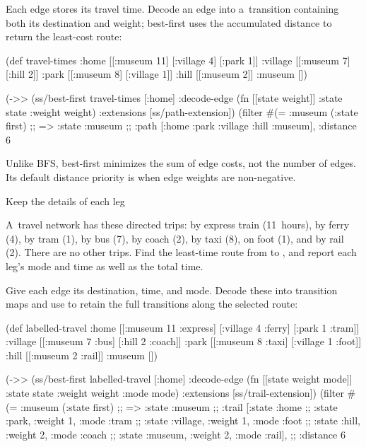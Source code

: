 {{\smallskip
{} Each edge stores its travel time. Decode an edge
into a~transition containing both its destination and weight; best-first
uses the accumulated distance to return the least-cost route:

\begtt {}
(def travel-times
  {:home [[:museum 11] [:village 4] [:park 1]]
   :village [[:museum 7] [:hill 2]]
   :park [[:museum 8] [:village 1]]
   :hill [[:museum 2]]
   :museum []})

(->> (ss/best-first travel-times [:home]
                        {:decode-edge (fn [[state weight]]
                                        {:state state :weight weight})
                         :extensions [ss/path-extension]})
     (filter #(= :museum (:state %
     first)
;; => {:state :museum
;;     :path [:home :park :village :hill :museum], :distance 6}
\endtt

Unlike BFS, best-first minimizes the sum of edge costs, not the number of
edges. Its default distance priority is
when edge weights are non-negative.

\secc Keep the details of each leg

 A~travel network has these directed trips:
 by express train (11~hours),  by ferry (4),  by tram (1),
 by bus (7),  by coach
(2),  by taxi (8),  on
foot (1), and  by rail (2). There are no other
trips. Find the least-time route from  to , and
report each leg's mode and time as well as the total time.

\smallskip
{} Give each edge its destination, time, and mode.
Decode these into transition maps and use  to retain
the full transitions along the selected route:

\begtt {}
(def labelled-travel
  {:home [[:museum 11 :express]
          [:village 4 :ferry]
          [:park 1 :tram]]
   :village [[:museum 7 :bus]
             [:hill 2 :coach]]
   :park [[:museum 8 :taxi]
          [:village 1 :foot]]
   :hill [[:museum 2 :rail]]
   :museum []})

(->> (ss/best-first labelled-travel [:home]
                        {:decode-edge (fn [[state weight mode]]
                                        {:state state
                                         :weight weight
                                         :mode mode})
                         :extensions [ss/trail-extension]})
     (filter #(= :museum (:state %
     first)
;; => {:state :museum
;;     :trail [{:state :home}
;;             {:state :park, :weight 1, :mode :tram}
;;             {:state :village, :weight 1, :mode :foot}
;;             {:state :hill, :weight 2, :mode :coach}
;;             {:state :museum, :weight 2, :mode :rail}],
;;     :distance 6}
\endtt

}}

